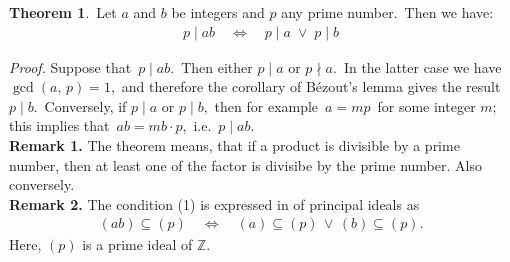 \documentclass[12pt]{article}
\theoremstyle{definition}
\newtheorem*{thmplain}{Theorem}
\begin{document}
\begin{thmplain}
 \,Let $a$ and $b$ be integers and $p$ any prime number. \,Then we have:
\begin{align}
       p \mid ab \quad \Leftrightarrow \quad p \mid a\; \lor\; p \mid b
\end{align}
\end{thmplain}
{\em Proof.}  Suppose that\, $p \mid ab$.\,  Then either\; $p \mid a$\; or\; $p \nmid a$.\, In the latter case we have\, $\gcd(a,\,p) = 1$,\, and therefore the corollary of B\'ezout's lemma gives the result\, $p \mid b$.\,  Conversely, if\; $p \mid a$\; or\; $p \mid b$,\, then for example\, $a = mp$\, for some integer $m$; this implies that\, $ab = mb\cdot p$,\, i.e.\, $p \mid ab$.\\

\textbf{Remark 1.}  The theorem means, that if a product is divisible by a prime number, then at least one of the factor is divisibe by the prime number.  Also conversely.\\

\textbf{Remark 2.}  The condition (1) is expressed in  of principal ideals as
\begin{align}
      (ab)\subseteq (p) \quad \Leftrightarrow \quad 
          (a)\subseteq (p)\, \lor\, (b)\subseteq (p).
\end{align}
Here, $(p)$ is a prime ideal of $\mathbb{Z}$.
\end{document}
